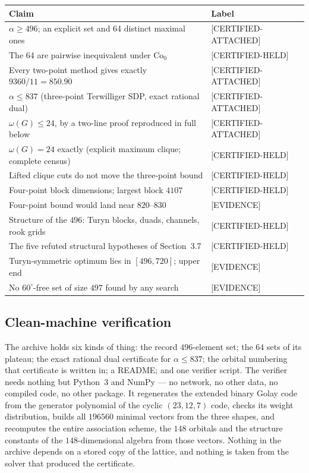 \documentclass[10pt,a4paper]{article}
\newcommand{\CA}{\textsf{[CERTIFIED-ATTACHED]}}
\newcommand{\CH}{\textsf{[CERTIFIED-HELD]}}
\newcommand{\EV}{\textsf{[EVIDENCE]}}
\newcommand{\Co}{\mathrm{Co}_0}
\begin{document}
\begin{center}
\small
\begin{tabular}{@{}p{}l@{}}
\toprule
Claim & Label \\
\midrule
$\alpha \ge 496$; an explicit set and 64 distinct maximal ones & \CA \\
The 64 are pairwise inequivalent under $\Co$ & \CH \\
Every two-point method gives exactly $9360/11 = 850.\overline{90}$ & \CA \\
$\alpha \le 837$ (three-point Terwilliger SDP, exact rational dual) & \CA \\
$\omega(G) \le 24$, by a two-line proof reproduced in full below & \CA \\
$\omega(G) = 24$ exactly (explicit maximum clique; complete census) & \CH \\
Lifted clique cuts do not move the three-point bound & \CH \\
Four-point block dimensions; largest block $4107$ & \CH \\
Four-point bound would land near $820$--$830$ & \EV \\
Structure of the $496$: Turyn blocks, duads, channels, rook grids & \CH \\
The five refuted structural hypotheses of Section~3.7 & \CH \\
Turyn-symmetric optimum lies in $[496,720]$; upper end & \EV \\
No $60^\circ$-free set of size $497$ found by any search & \EV \\
\bottomrule
\end{tabular}
\end{center}

\subsection{Clean-machine verification}

The archive holds six kinds of thing: the record $496$-element set; the $64$ sets of its plateau;
the exact rational dual certificate for $\alpha \le 837$; the orbital numbering that certificate is
written in; a README; and one verifier script. The verifier needs nothing but Python~3 and NumPy ---
no network, no other data, no compiled code, no other package. It regenerates the extended binary
Golay code from the generator polynomial of the cyclic $(23,12,7)$ code, checks its weight
distribution, builds all $196560$ minimal vectors from the three shapes, and recomputes the entire
association scheme, the $148$ orbitals and the structure constants of the $148$-dimensional algebra
from those vectors. Nothing in the archive depends on a stored copy of the lattice, and nothing is
taken from the solver that produced the certificate.
\end{document}
